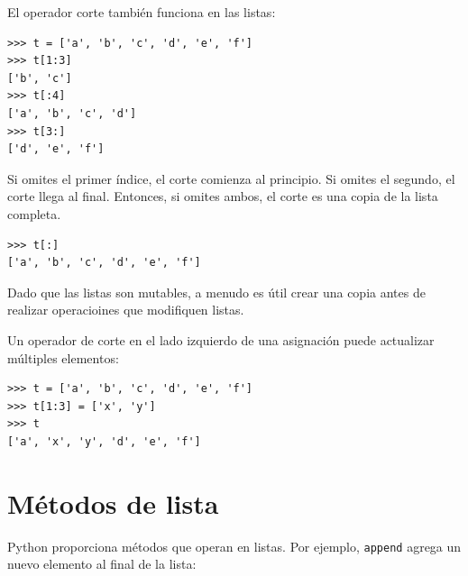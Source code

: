 \documentclass[10pt]{book}
\begin{document}
El operador corte también funciona en las listas:

\begin{verbatim}
>>> t = ['a', 'b', 'c', 'd', 'e', 'f']
>>> t[1:3]
['b', 'c']
>>> t[:4]
['a', 'b', 'c', 'd']
>>> t[3:]
['d', 'e', 'f']
\end{verbatim}
%
Si omites el primer índice, el corte comienza al principio.
Si omites el segundo, el corte llega al final.  Entonces, si
omites ambos, el corte es una copia de la lista completa.

\begin{verbatim}
>>> t[:]
['a', 'b', 'c', 'd', 'e', 'f']
\end{verbatim}
%
Dado que las listas son mutables, a menudo es útil crear una copia
antes de realizar operacioines que modifiquen listas.

Un operador de corte en el lado izquierdo de una asignación
puede actualizar múltiples elementos:

\begin{verbatim}
>>> t = ['a', 'b', 'c', 'd', 'e', 'f']
>>> t[1:3] = ['x', 'y']
>>> t
['a', 'x', 'y', 'd', 'e', 'f']
\end{verbatim}
%


%

%


\section{Métodos de lista}

Python proporciona métodos que operan en listas.  Por ejemplo,
{\tt append} agrega un nuevo elemento al final de la lista:
\end{document}
